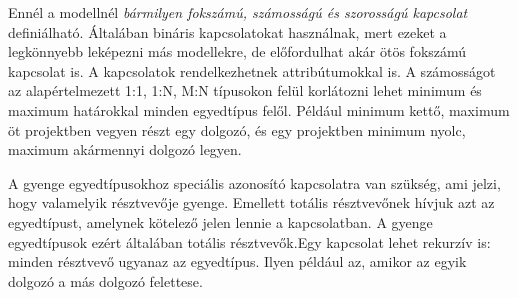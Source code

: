 Ennél a modellnél \emph{bármilyen fokszámú, számosságú és szorosságú kapcsolat} definiálható. Általában bináris kapcsolatokat használnak, mert ezeket a legkönnyebb leképezni más modellekre, de előfordulhat akár ötös fokszámú kapcsolat is. A kapcsolatok rendelkezhetnek attribútumokkal is. A számosságot az alapértelmezett 1:1, 1:N, M:N típusokon felül korlátozni lehet minimum és maximum határokkal minden egyedtípus felől. Például minimum kettő, maximum öt projektben vegyen részt egy dolgozó, és egy projektben minimum nyolc, maximum akármennyi dolgozó legyen.

A gyenge egyedtípusokhoz speciális azonosító kapcsolatra van szükség, ami jelzi, hogy valamelyik résztvevője gyenge. Emellett totális résztvevőnek hívjuk azt az egyedtípust, amelynek kötelező jelen lennie a kapcsolatban. A gyenge egyedtípusok ezért általában totális résztvevők.Egy kapcsolat lehet rekurzív is: minden résztvevő ugyanaz az egyedtípus. Ilyen például az, amikor az egyik dolgozó a más dolgozó felettese.
